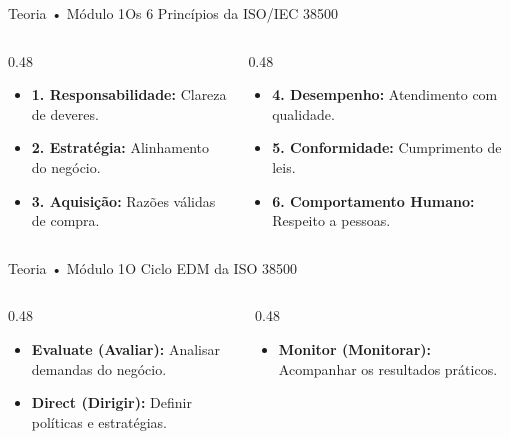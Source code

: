 \begin{senaiframe}{Teoria • Módulo 1}{Os 6 Princípios da ISO/IEC 38500}
  \begin{columns}[t]
    \begin{column}{0.48\textwidth}
      \begin{tcolorbox}[senaibluecard, title={Princípios 1 a 3}]
        \begin{itemize}
          \item \textbf{1. Responsabilidade:} Clareza de deveres.
          \item \textbf{2. Estratégia:} Alinhamento do negócio.
          \item \textbf{3. Aquisição:} Razões válidas de compra.
        \end{itemize}
      \end{tcolorbox}
    \end{column}
    \begin{column}{0.48\textwidth}
      \begin{tcolorbox}[senaiambercard, title={Princípios 4 a 6}]
        \begin{itemize}
          \item \textbf{4. Desempenho:} Atendimento com qualidade.
          \item \textbf{5. Conformidade:} Cumprimento de leis.
          \item \textbf{6. Comportamento Humano:} Respeito a pessoas.
        \end{itemize}
      \end{tcolorbox}
    \end{column}
  \end{columns}
\end{senaiframe}

\begin{senaiframe}{Teoria • Módulo 1}{O Ciclo EDM da ISO 38500}
  \begin{columns}[t]
    \begin{column}{0.48\textwidth}
      \begin{tcolorbox}[senaibluecard, title={Evaluate \& Direct}]
        \begin{itemize}
          \item \textbf{Evaluate (Avaliar):} Analisar demandas do negócio.
          \item \textbf{Direct (Dirigir):} Definir políticas e estratégias.
        \end{itemize}
      \end{tcolorbox}
    \end{column}
    \begin{column}{0.48\textwidth}
      \begin{tcolorbox}[senaigreencard, title={Monitor}]
        \begin{itemize}
          \item \textbf{Monitor (Monitorar):} Acompanhar os resultados práticos.
        \end{itemize}
      \end{tcolorbox}
    \end{column}
  \end{columns}
\end{senaiframe}

